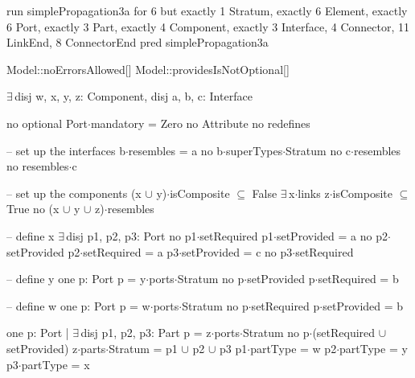 run simplePropagation3a for 6 but exactly 1 Stratum, exactly 6 Element, exactly 6 Port, exactly 3 Part, exactly 4 Component, exactly 3 Interface, 4 Connector, 11 LinkEnd, 8 ConnectorEnd
pred simplePropagation3a
{
  Model::noErrorsAllowed[]
  Model::providesIsNotOptional[]

  $\exists\,$disj w, x, y, z: Component,
       disj a, b, c: Interface
  {
    no optional
    Port$\cdot$mandatory = Zero
    no Attribute
    no redefines
  
    -- set up the interfaces
    b$\cdot$resembles = a
    no b$\cdot$superTypes$\cdot$Stratum
    no c$\cdot$resembles
    no resembles$\cdot$c
  
    -- set up the components
    (x $\cup$ y)$\cdot$isComposite $\subseteq$ False
    $\exists\,$x$\cdot$links
    z$\cdot$isComposite $\subseteq$ True
    no (x $\cup$ y $\cup$ z)$\cdot$resembles
    
    -- define x
    $\exists\,$disj p1, p2, p3: Port
    {
      no p1$\cdot$setRequired
      p1$\cdot$setProvided = a
      no p2$\cdot$setProvided
      p2$\cdot$setRequired = a
      p3$\cdot$setProvided = c
      no p3$\cdot$setRequired
    }
    
    -- define y
    one p: Port
    {
      p = y$\cdot$ports$\cdot$Stratum
      no p$\cdot$setProvided
      p$\cdot$setRequired = b
    }
    
    -- define w
    one p: Port
    {
      p = w$\cdot$ports$\cdot$Stratum
      no p$\cdot$setRequired
      p$\cdot$setProvided = b
    }
    
    one p: Port | $\exists\,$disj p1, p2, p3: Part
    {
      p = z$\cdot$ports$\cdot$Stratum
      no p$\cdot$(setRequired $\cup$ setProvided)
      z$\cdot$parts$\cdot$Stratum = p1 $\cup$ p2 $\cup$ p3
      p1$\cdot$partType = w
      p2$\cdot$partType = y
      p3$\cdot$partType = x
    }
  }
}

